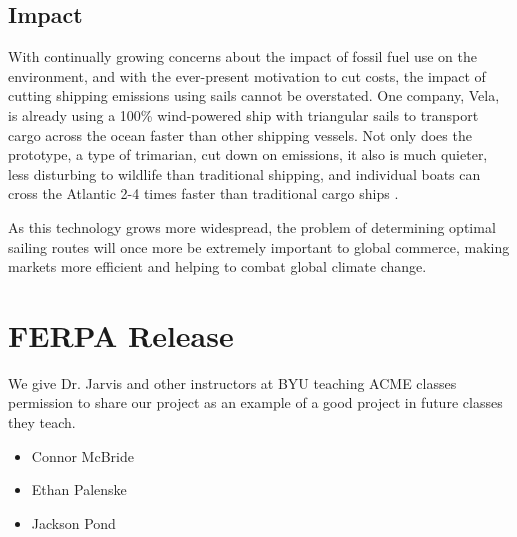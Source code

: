 \documentclass[11pt]{amsart}
\begin{document}
\subsection{Impact}

\par With continually growing concerns about the impact of fossil fuel use on the environment, and with the ever-present motivation to cut costs, the impact of cutting shipping emissions using sails cannot be overstated. One company, Vela, is already using a 100\% wind-powered ship with triangular sails to transport cargo across the ocean faster than other shipping vessels. Not only does the prototype, a type of trimarian, cut down on emissions, it also is much quieter, less disturbing to wildlife than traditional shipping, and individual boats can cross the Atlantic 2-4 times faster than traditional cargo ships \cite{page2026vela}.

\par As this technology grows more widespread, the problem of determining optimal sailing routes will once more be extremely important to global commerce, making markets more efficient and helping to combat global climate change.


\section{FERPA Release}
We give Dr. Jarvis and other instructors at BYU teaching ACME classes permission to share our project as an example of a good project in future classes they teach.

\begin{itemize}
    \item Connor McBride
    \item Ethan Palenske
    \item Jackson Pond
\end{itemize}

\FloatBarrier %
\newpage


\end{document}
